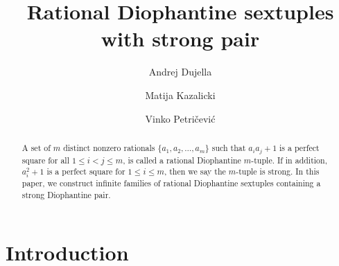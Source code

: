 \documentclass[a4paper]{amsart}
\title[Rational Diophantine sextuples with strong pair]
{Rational Diophantine sextuples with strong pair}
\theoremstyle{plain}
\theoremstyle{definition}
\begin{document}
\date{}


\author[A. Dujella]{Andrej Dujella}
\address{
Department of Mathematics\\
Faculty of Science\\
University of Zagreb\\
Bijeni{\v c}ka cesta 30, 10000 Zagreb, Croatia
}

\author[M. Kazalicki]{Matija Kazalicki}
\address{
Department of Mathematics\\
Faculty of Science\\
University of Zagreb\\
Bijeni{\v c}ka cesta 30, 10000 Zagreb, Croatia
}

\author[V. Petri\v{c}evi\'c]{Vinko Petri\v{c}evi\'c}
\address{
Faculty of Electrical Engineering, Computer Science and Information Technology Osijek\\
Josip Juraj Strossmayer University of Osijek\\
Kneza Trpimira 2B, HR-31000 Osijek, Croatia
}


\begin{abstract}
A set of $m$ distinct nonzero rationals $\{a_1, a_2,\ldots, a_m\}$ such that $a_i a_j+1$ is a perfect square for all $1\le i <j \le m$, is called a rational Diophantine $m$-tuple. If in addition, $a_i^2+1$ is a perfect square for $1\le i\le m$, then we say the $m$-tuple is strong. In this paper, we construct infinite families of rational Diophantine sextuples containing a strong Diophantine pair.

\end{abstract}


\maketitle

\section{Introduction}
\end{document}
